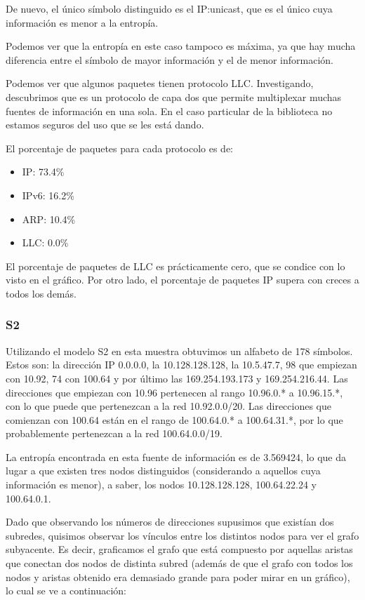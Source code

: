 De nuevo, el único símbolo distinguido es el IP:unicast, que es el único cuya
información es menor a la entropía.

Podemos ver que la entropía en este caso tampoco es máxima, ya que hay mucha 
diferencia entre el símbolo de mayor información y el de menor información.

Podemos ver que algunos paquetes tienen protocolo LLC. Investigando, descubrimos
que es un protocolo de capa dos que permite multiplexar muchas fuentes de
información en una sola. En el caso particular de la biblioteca no
estamos seguros del uso que se les está dando.

El porcentaje de paquetes para cada protocolo es de:
\begin{itemize}
	\item IP: 73.4\%
	\item IPv6: 16.2\%
	\item ARP: 10.4\%
	\item LLC: 0.0\%
\end{itemize}

El porcentaje de paquetes de LLC es prácticamente cero, que se condice con lo
visto en el gráfico. Por otro lado, el porcentaje de paquetes IP supera con
creces a todos los demás.

\subsubsection{S2}

Utilizando el modelo S2 en esta muestra obtuvimos un
alfabeto de 178 símbolos. Estos son: la dirección IP 0.0.0.0, la 10.128.128.128,
la 10.5.47.7, 98 que empiezan con 10.92, 74 con 100.64 y por último
las 169.254.193.173 y 169.254.216.44. Las direcciones que empiezan con
10.96 pertenecen al rango 10.96.0.* a 10.96.15.*, con lo
que puede que pertenezcan a la red 10.92.0.0/20. Las direcciones que comienzan
con 100.64 están en el rango de 100.64.0.* a 100.64.31.*, por lo que
probablemente pertenezcan a la red 100.64.0.0/19.

La entropía encontrada en esta fuente de información es de 3.569424,
lo que da lugar a que existen tres nodos distinguidos (considerando a
aquellos cuya información es menor), a saber, los nodos
10.128.128.128, 100.64.22.24 y 100.64.0.1.

Dado que observando los números de direcciones supusimos que existían dos
subredes, quisimos observar los vínculos entre los distintos nodos
para ver el grafo subyacente. Es decir, graficamos el grafo que está
compuesto por aquellas aristas que conectan dos nodos de distinta
subred (además de que el grafo con todos los nodos y aristas obtenido
era demasiado grande para poder mirar en un gráfico), lo cual se ve a
continuación:

